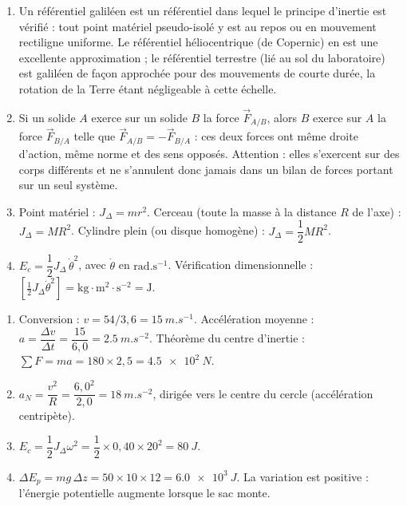 \documentclass[11pt]{article}
\begin{document}
\begin{corrige}
\begin{enumerate}
\item Un référentiel galiléen est un référentiel dans lequel le principe d'inertie est vérifié : tout point matériel pseudo-isolé y est au repos ou en mouvement rectiligne uniforme. Le référentiel héliocentrique (de Copernic) en est une excellente approximation ; le référentiel terrestre (lié au sol du laboratoire) est galiléen de façon approchée pour des mouvements de courte durée, la rotation de la Terre étant négligeable à cette échelle.
\item Si un solide $A$ exerce sur un solide $B$ la force $\vec{F}_{A/B}$, alors $B$ exerce sur $A$ la force $\vec{F}_{B/A}$ telle que $\vec{F}_{A/B} = -\vec{F}_{B/A}$ : ces deux forces ont même droite d'action, même norme et des sens opposés. Attention : elles s'exercent sur des corps différents et ne s'annulent donc jamais dans un bilan de forces portant sur un seul système.
\item Point matériel : $J_\Delta = m r^2$. Cerceau (toute la masse à la distance $R$ de l'axe) : $J_\Delta = M R^2$. Cylindre plein (ou disque homogène) : $J_\Delta = \dfrac{1}{2}MR^2$.
\item $E_c = \dfrac{1}{2} J_\Delta\, \dot{\theta}^2$, avec $\dot{\theta}$ en $\mathrm{rad.s^{-1}}$. Vérification dimensionnelle : $[\tfrac{1}{2}J_\Delta\dot{\theta}^2] = \mathrm{kg \cdot m^2 \cdot s^{-2}} = \mathrm{J}$.
\end{enumerate}
\end{corrige}

\begin{corrige}
\begin{enumerate}
\item Conversion : $v = 54/3{,}6 = \SI{15}{m.s^{-1}}$. Accélération moyenne : $a = \dfrac{\Delta v}{\Delta t} = \dfrac{15}{6{,}0} = \SI{2,5}{m.s^{-2}}$. Théorème du centre d'inertie : $\sum F = ma = 180 \times 2{,}5 = \SI{4,5e2}{N}$.
\item $a_N = \dfrac{v^2}{R} = \dfrac{6{,}0^2}{2{,}0} = \SI{18}{m.s^{-2}}$, dirigée vers le centre du cercle (accélération centripète).
\item $E_c = \dfrac{1}{2} J_\Delta \omega^2 = \dfrac{1}{2} \times 0{,}40 \times 20^2 = \SI{80}{J}$.
\item $\Delta E_p = mg\,\Delta z = 50 \times 10 \times 12 = \SI{6,0e3}{J}$. La variation est positive : l'énergie potentielle augmente lorsque le sac monte.
\end{enumerate}
\end{corrige}
\end{document}
